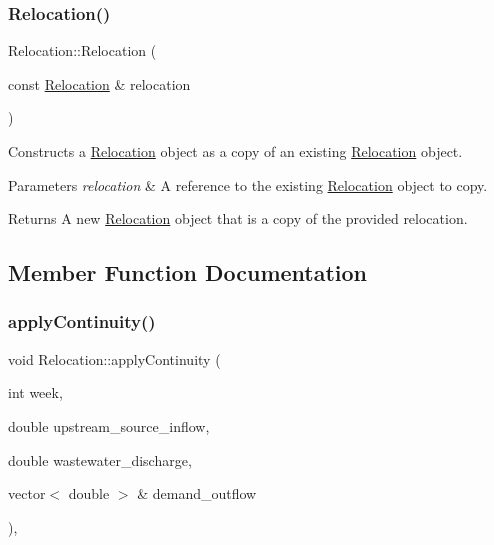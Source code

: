 \subsubsection{\texorpdfstring{Relocation()}{Relocation()}\hspace{0.1cm}{\footnotesize\ttfamily [2/2]}}
{\footnotesize\ttfamily Relocation\+::\+Relocation (\begin{DoxyParamCaption}\item[{const \mbox{\hyperlink{classRelocation}{Relocation}} \&}]{relocation }\end{DoxyParamCaption})}



Constructs a \mbox{\hyperlink{classRelocation}{Relocation}} object as a copy of an existing \mbox{\hyperlink{classRelocation}{Relocation}} object. 


\begin{DoxyParams}{Parameters}
{\em relocation} & A reference to the existing \mbox{\hyperlink{classRelocation}{Relocation}} object to copy.\\
\hline
\end{DoxyParams}
\begin{DoxyReturn}{Returns}
A new \mbox{\hyperlink{classRelocation}{Relocation}} object that is a copy of the provided {\ttfamily relocation}. 
\end{DoxyReturn}


\subsection{Member Function Documentation}
\mbox{\label{classRelocation_af5c795c7b331b86b31c8bfa2ef9b6fe5}} 
\subsubsection{\texorpdfstring{apply\+Continuity()}{applyContinuity()}}
{\footnotesize\ttfamily void Relocation\+::apply\+Continuity (\begin{DoxyParamCaption}\item[{int}]{week,  }\item[{double}]{upstream\+\_\+source\+\_\+inflow,  }\item[{double}]{wastewater\+\_\+discharge,  }\item[{vector$<$ double $>$ \&}]{demand\+\_\+outflow }\end{DoxyParamCaption})\hspace{0.3cm}{\ttfamily [override]}, {\ttfamily [virtual]}}



